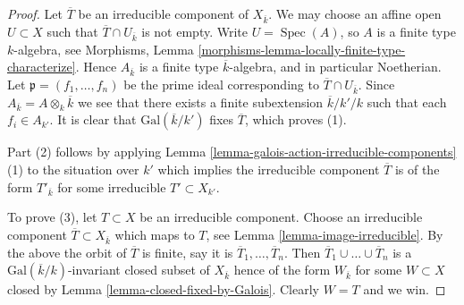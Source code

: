 \documentclass[10pt,a4paper]{amsart}
\theoremstyle{plain}
\theoremstyle{definition}
\theoremstyle{remark}
\numberwithin{equation}{subsection}
\def\Spec{\mathop{\mathrm{Spec}}}
\begin{document}
\begin{proof}
Let $\overline{T}$ be an irreducible component of $X_{\overline{k}}$.
We may choose an affine open $U \subset X$ such that
$\overline{T} \cap U_{\overline{k}}$ is not empty.
Write $U = \Spec(A)$, so $A$ is a finite type $k$-algebra, see
Morphisms, Lemma \ref{morphisms-lemma-locally-finite-type-characterize}.
Hence $A_{\overline{k}}$ is a finite type $\overline{k}$-algebra,
and in particular Noetherian. Let $\mathfrak p = (f_1, \ldots, f_n)$
be the prime ideal corresponding to $\overline{T} \cap U_{\overline{k}}$.
Since $A_{\overline{k}} = A \otimes_k \overline{k}$
we see that there exists a finite subextension
$\overline{k}/k'/k$ such that each $f_i \in A_{k'}$.
It is clear that $\text{Gal}(\overline{k}/k')$
fixes $\overline{T}$, which proves (1).

\medskip\noindent
Part (2) follows by applying
Lemma \ref{lemma-galois-action-irreducible-components} (1)
to the situation over $k'$ which implies the irreducible component
$\overline{T}$ is of the form $T'_{\overline{k}}$ for some irreducible
$T' \subset X_{k'}$.

\medskip\noindent
To prove (3), let $T \subset X$ be an irreducible component.
Choose an irreducible component $\overline{T} \subset X_{\overline{k}}$
which maps to $T$, see
Lemma \ref{lemma-image-irreducible}.
By the above the orbit of $\overline{T}$ is finite, say it is
$\overline{T}_1, \ldots, \overline{T}_n$. Then
$\overline{T}_1 \cup \ldots \cup \overline{T}_n$
is a $\text{Gal}(\overline{k}/k)$-invariant closed subset of $X_{\overline{k}}$
hence of the form $W_{\overline{k}}$ for some $W \subset X$ closed by
Lemma \ref{lemma-closed-fixed-by-Galois}.
Clearly $W = T$ and we win.
\end{proof}
\end{document}
